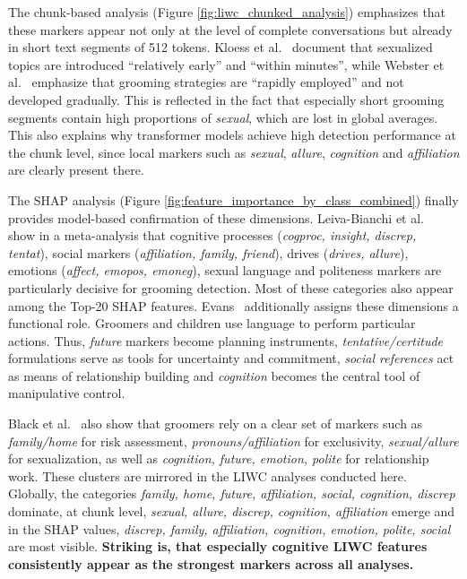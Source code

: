 The chunk-based analysis (Figure \ref{fig:liwc_chunked_analysis}) emphasizes that these markers appear not only at the level of complete conversations but already in short text segments of 512 tokens. Kloess et al.~\cite{kloess2014online} document that sexualized topics are introduced “relatively early” and “within minutes”, while Webster et al.~\cite{webster2021european} emphasize that grooming strategies are “rapidly employed” and not developed gradually. This is reflected in the fact that especially short grooming segments contain high proportions of \textit{sexual}, which are lost in global averages. This also explains why transformer models achieve high detection performance at the chunk level, since local markers such as \textit{sexual}, \textit{allure}, \textit{cognition} and \textit{affiliation} are clearly present there.

The SHAP analysis (Figure \ref{fig:feature_importance_by_class_combined}) finally provides model-based confirmation of these dimensions. Leiva-Bianchi et al.~\cite{leiva2024meta} show in a meta-analysis that cognitive processes (\textit{cogproc, insight, discrep, tentat}), social markers (\textit{affiliation, family, friend}), drives (\textit{drives, allure}), emotions (\textit{affect, emopos, emoneg}), sexual language and politeness markers are particularly decisive for grooming detection. Most of these categories also appear among the Top-20 SHAP features. Evans~\cite{evans2025corpus} additionally assigns these dimensions a functional role. Groomers and children use language to perform particular actions. Thus, \textit{future} markers become planning instruments, \textit{tentative/certitude} formulations serve as tools for uncertainty and commitment, \textit{social references} act as means of relationship building and \textit{cognition} becomes the central tool of manipulative control.  

Black et al.~\cite{black2015linguistic} also show that groomers rely on a clear set of markers such as \textit{family/home} for risk assessment, \textit{pronouns/affiliation} for exclusivity, \textit{sexual/allure} for sexualization, as well as \textit{cognition, future, emotion, polite} for relationship work. These clusters are mirrored in the LIWC analyses conducted here. Globally, the categories \textit{family, home, future, affiliation, social, cognition, discrep} dominate, at chunk level, \textit{sexual, allure, discrep, cognition, affiliation} emerge and in the SHAP values, \textit{discrep, family, affiliation, cognition, emotion, polite, social} are most visible. \textbf{Striking is, that especially cognitive LIWC features consistently appear as the strongest markers across all analyses.}

